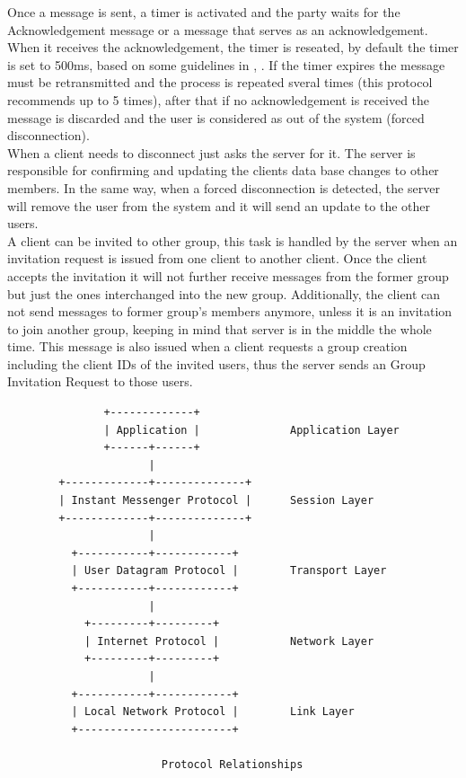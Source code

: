 \documentclass{article}
\begin{document}
Once a message is sent, a timer is activated and the party waits for the Acknowledgement message or a message that serves as an acknowledgement. When it receives the acknowledgement, the timer is reseated, by default the timer is set to 500ms, based on some guidelines in \cite{1}, \cite{2}. If the timer expires the message must be retransmitted and the process is repeated sveral times (this protocol recommends up to 5 times), after that if no acknowledgement is received the message is discarded and the user is considered as out of the system (forced disconnection).\\

When a client needs to disconnect just asks the server for it. The server is responsible for confirming and updating the clients data base changes to other members. In the same way, when a forced disconnection is detected, the server will remove the user from the system and it will send an update to the other users.\\

A client can be invited to other group, this task is handled by the server when an invitation request is issued from one client to another client. Once the client accepts the invitation it will not further receive messages from the former group but just the ones interchanged into the new group. Additionally, the client can not send messages to former group's members anymore, unless it is an invitation to join another group, keeping in mind that server is in the middle the whole time. This message is also issued when a client requests a group creation including the client IDs of the invited users, thus the server sends an Group Invitation Request to those users.\\


\begin{verbatim}
               +-------------+
               | Application |              Application Layer
               +------+------+
                      |
        +-------------+--------------+
        | Instant Messenger Protocol |      Session Layer
        +-------------+--------------+
                      |
          +-----------+------------+
          | User Datagram Protocol |        Transport Layer
          +-----------+------------+
                      |
            +---------+---------+
            | Internet Protocol |           Network Layer
            +---------+---------+
                      |
          +-----------+------------+
          | Local Network Protocol |        Link Layer
          +------------------------+
          
                        Protocol Relationships
\end{verbatim}
\end{document}
